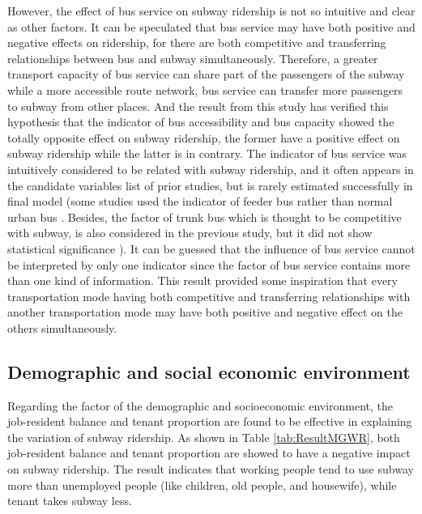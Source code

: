 \documentclass[utf8]{article}
\begin{document}
%
However, the effect of bus service on subway ridership is not so intuitive and clear as other factors. It can be speculated that bus service may have both positive and negative effects on ridership, for there are both competitive and transferring relationships between bus and subway simultaneously. Therefore, a greater transport capacity of bus service can share part of the passengers of the subway while a more accessible route network, bus service can transfer more passengers to subway from other places. And the result from this study has verified this hypothesis that the indicator of bus accessibility and bus capacity showed the totally opposite effect on subway ridership, the former have a positive effect on subway ridership while the latter is in contrary. The indicator of bus service was intuitively considered to be related with subway ridership, and it often appears in the candidate variables list of prior studies, but is rarely estimated successfully in final model (some studies used the indicator of feeder bus rather than normal urban bus \cite{Sohn2010,Cardozo2012,Zhao2013}. Besides, the factor of trunk bus which is thought to be competitive with subway, is also considered in the previous study, but it did not show statistical significance \cite{Sohn2010}). It can be guessed that the influence of bus service cannot be interpreted by only one indicator since the factor of bus service contains more than one kind of information. This result provided some inspiration that every transportation mode having both competitive and transferring relationships with another transportation mode may have both positive and negative effect on the others simultaneously.

%
\subsection{Demographic and social economic environment}
\indent

Regarding the factor of the demographic and socioeconomic environment, the job-resident balance and tenant proportion are found to be effective in explaining the variation of subway ridership. As shown in Table \ref{tab:ResultMGWR}, both job-resident balance and tenant proportion are showed to have a negative impact on subway ridership. The result indicates that working people tend to use subway more than unemployed people (like children, old people, and housewife), while tenant takes subway less.
\end{document}
